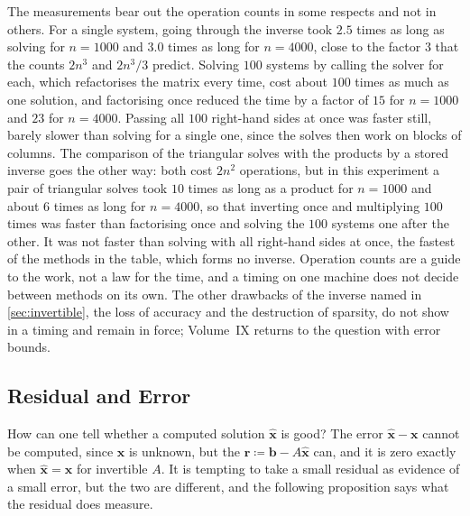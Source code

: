 The measurements bear out the operation counts in some respects and not in others. For a single system, going through the inverse took $2.5$ times as long as solving for $n=1000$ and $3.0$ times as long for $n=4000$, close to the factor $3$ that the counts $2n^3$ and $2n^3/3$ predict. Solving $100$ systems by calling the solver for each, which refactorises the matrix every time, cost about $100$ times as much as one solution, and factorising once reduced the time by a factor of $15$ for $n=1000$ and $23$ for $n=4000$. Passing all $100$ right-hand sides at once was faster still, barely slower than solving for a single one, since the solves then work on blocks of columns. The comparison of the triangular solves with the products by a stored inverse goes the other way: both cost $2n^2$ operations, but in this experiment a pair of triangular solves took $10$ times as long as a product for $n=1000$ and about $6$ times as long for $n=4000$, so that inverting once and multiplying $100$ times was faster than factorising once and solving the $100$ systems one after the other. It was not faster than solving with all right-hand sides at once, the fastest of the methods in the table, which forms no inverse. Operation counts are a guide to the work, not a law for the time, and a timing on one machine does not decide between methods on its own. The other drawbacks of the inverse named in \cref{sec:invertible}, the loss of accuracy and the destruction of sparsity, do not show in a timing and remain in force; Volume~IX returns to the question with error bounds.

\subsection{Residual and Error}

How can one tell whether a computed solution $\hat{\mathbf x}$ is good? The error $\hat{\mathbf x}-\mathbf x$ cannot be computed, since $\mathbf x$ is unknown, but the  $\mathbf r\coloneqq\mathbf b-A\hat{\mathbf x}$ can, and it is zero exactly when $\hat{\mathbf x}=\mathbf x$ for invertible $A$. It is tempting to take a small residual as evidence of a small error, but the two are different, and the following proposition says what the residual does measure.

